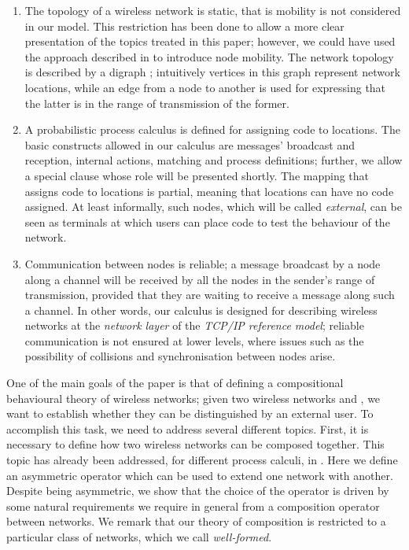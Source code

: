 \documentclass{LMCS}
\begin{document}
\begin{enumerate}[label=(\roman*)]
\item The topology of a wireless network is static, that is mobility is not 
considered in our model. 
This restriction has been done to allow a more clear presentation of the 
topics treated in this paper; however, 
we could have used the approach described in \cite{francalanza2008} to 
introduce node mobility.
The network topology is 
described by a digraph ; 
intuitively vertices in this graph represent network locations, while 
an edge from a node to another is used for expressing that the latter is 
in the range of transmission of the former. 

\item A probabilistic process calculus is defined for assigning code to locations. 
The basic constructs allowed in our calculus are messages' broadcast and reception, 
internal actions, matching and process definitions; further, we allow a special clause 
 whose role will be presented shortly.  
The mapping that assigns code to locations is partial, meaning that locations can have no code 
assigned. At least informally, such nodes, which will be called \emph{external}, 
can be seen as terminals at which users can place code 
to test the behaviour of the network.

\item Communication between nodes is reliable; a message broadcast by a 
node along a channel  will be received by all the nodes in the sender's 
range of transmission, provided that they are waiting to receive a message 
along such a channel. In other words, our calculus is designed for describing 
wireless networks at the \emph{network layer} of the \emph{TCP/IP reference model}; 
reliable communication is not ensured at lower levels, where 
issues such as the possibility of collisions \cite{macsurvey} and synchronisation between 
nodes \cite{time} arise.
\end{enumerate}

\noindent One of the main goals of the paper is that of defining a compositional behavioural 
theory of wireless networks; given two wireless networks  and 
, we want to establish whether they can be distinguished by 
an external user. 
To accomplish this task, we need to address several different topics. 
First, it is necessary to define how two wireless networks can be composed 
together. 
This topic has already 
been addressed, for different process calculi, in \cite{merro,gallina2011,CHM12,bugliesi2012,songphd}.
Here we define an asymmetric operator 
 which can be used to extend one network with another. 
Despite being asymmetric, we show that the choice of the operator  is 
driven by  some natural requirements we require in general 
from a composition operator between networks. 
We remark that our theory 
of composition is restricted to a particular class of networks, 
which we call \emph{well-formed}.
\end{document}
